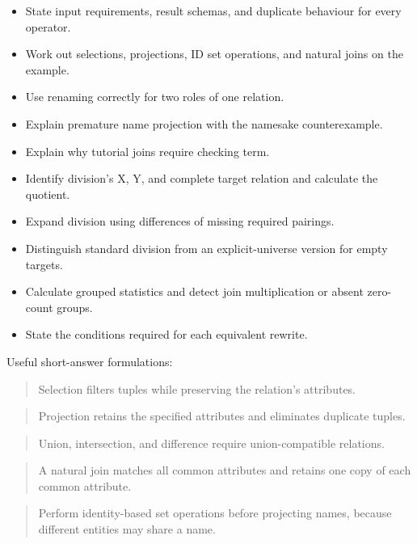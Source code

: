 \begin{itemize}
\tightlist
\item[$\square$]
  State input requirements, result schemas, and duplicate behaviour for every operator.
\item[$\square$]
  Work out selections, projections, ID set operations, and natural joins on the example.
\item[$\square$]
  Use renaming correctly for two roles of one relation.
\item[$\square$]
  Explain premature name projection with the namesake counterexample.
\item[$\square$]
  Explain why tutorial joins require checking term.
\item[$\square$]
  Identify division's X, Y, and complete target relation and calculate the quotient.
\item[$\square$]
  Expand division using differences of missing required pairings.
\item[$\square$]
  Distinguish standard division from an explicit-universe version for empty targets.
\item[$\square$]
  Calculate grouped statistics and detect join multiplication or absent zero-count groups.
\item[$\square$]
  State the conditions required for each equivalent rewrite.
\end{itemize}

Useful short-answer formulations:

\begin{quote}
Selection filters tuples while preserving the relation's attributes.
\end{quote}

\begin{quote}
Projection retains the specified attributes and eliminates duplicate tuples.
\end{quote}

\begin{quote}
Union, intersection, and difference require union-compatible relations.
\end{quote}

\begin{quote}
A natural join matches all common attributes and retains one copy of each common attribute.
\end{quote}

\begin{quote}
Perform identity-based set operations before projecting names, because different entities may share a name.
\end{quote}

